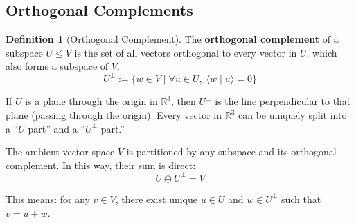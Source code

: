 \documentclass[11pt]{article}
\theoremstyle{definition}
\newtheorem{definition}{Definition}[section]
\theoremstyle{plain}
\theoremstyle{remark}
\begin{document}
\subsection{Orthogonal Complements}

\begin{definition}[Orthogonal Complement]
The \textbf{orthogonal complement} of a subspace $U \leq V$ is the set of all vectors orthogonal to every vector in $U$, which also forms a subspace of $V$.
\[
U^\perp := \{w \in V \mid \forall u \in U,\; \langle w \mid u \rangle = 0\}
\]
\end{definition}

\begin{intuitionbox}
If $U$ is a plane through the origin in $\mathbb{R}^3$, then $U^\perp$ is the line perpendicular to that plane (passing through the origin). Every vector in $\mathbb{R}^3$ can be uniquely split into a ``$U$ part'' and a ``$U^\perp$ part.''
\end{intuitionbox}

The ambient vector space $V$ is partitioned by any subspace and its orthogonal complement. In this way, their sum is direct:
\[
U \oplus U^\perp = V
\]

This means: for any $v \in V$, there exist unique $u \in U$ and $w \in U^\perp$ such that $v = u + w$.
\end{document}

